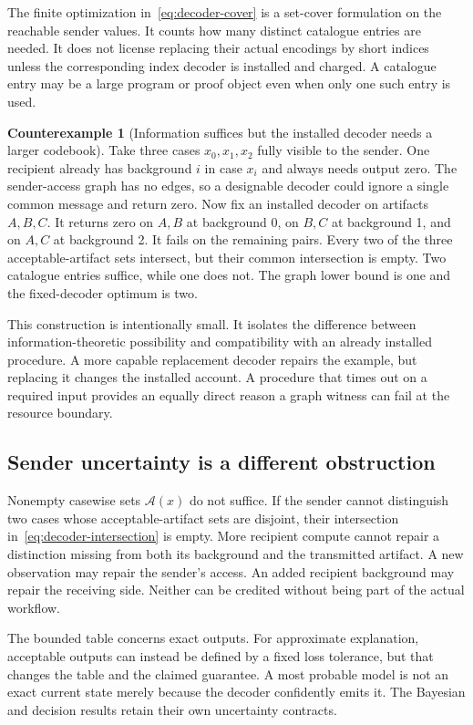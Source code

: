\documentclass[11pt,letterpaper]{article}
\theoremstyle{plain}
\theoremstyle{definition}
\newtheorem{counterexample}[theorem]{Counterexample}
\begin{document}
The finite optimization in~\eqref{eq:decoder-cover} is a set-cover formulation on the reachable sender values. It counts how many distinct catalogue entries are needed. It does not license replacing their actual encodings by short indices unless the corresponding index decoder is installed and charged. A catalogue entry may be a large program or proof object even when only one such entry is used.

\begin{counterexample}[Information suffices but the installed decoder needs a larger codebook]\label{ex:fixed-codebook}
Take three cases $x_0,x_1,x_2$ fully visible to the sender. One recipient already has background $i$ in case $x_i$ and always needs output zero. The sender-access graph has no edges, so a designable decoder could ignore a single common message and return zero. Now fix an installed decoder on artifacts $A,B,C$. It returns zero on $A,B$ at background 0, on $B,C$ at background 1, and on $A,C$ at background 2. It fails on the remaining pairs. Every two of the three acceptable-artifact sets intersect, but their common intersection is empty. Two catalogue entries suffice, while one does not. The graph lower bound is one and the fixed-decoder optimum is two.
\end{counterexample}

This construction is intentionally small. It isolates the difference between information-theoretic possibility and compatibility with an already installed procedure. A more capable replacement decoder repairs the example, but replacing it changes the installed account. A procedure that times out on a required input provides an equally direct reason a graph witness can fail at the resource boundary.

\subsection{Sender uncertainty is a different obstruction}
Nonempty casewise sets $\mathcal A(x)$ do not suffice. If the sender cannot distinguish two cases whose acceptable-artifact sets are disjoint, their intersection in~\eqref{eq:decoder-intersection} is empty. More recipient compute cannot repair a distinction missing from both its background and the transmitted artifact. A new observation may repair the sender's access. An added recipient background may repair the receiving side. Neither can be credited without being part of the actual workflow.

The bounded table concerns exact outputs. For approximate explanation, acceptable outputs can instead be defined by a fixed loss tolerance, but that changes the table and the claimed guarantee. A most probable model is not an exact current state merely because the decoder confidently emits it. The Bayesian and decision results retain their own uncertainty contracts.
\end{document}
